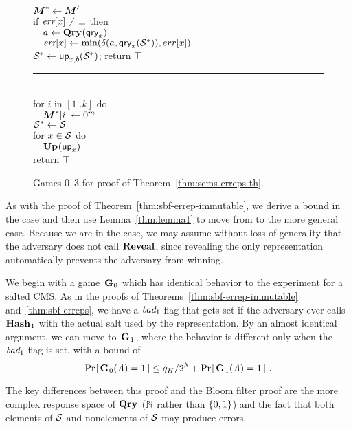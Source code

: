 \begin{figure*}
{    $\v.M^* \gets \v.M'$\\
    if $\textit{err}[x] \neq \bot$ then\\
      $\hspace*{10pt} a \gets \textup{\textbf{Qry}}\hspace{0.5pt}(\mathsf{qry}_x)$\\
      $\hspace*{10pt}\textit{err}[x] \gets \min(\delta(a,\mathsf{qry}_x(\mathcal{S}^*)),err[x])$\\
    $\mathcal{S}^* \gets \mathsf{up}_{x,b}(\mathcal{S}^*)$;
    return $\top$
  \vspace{6pt}\hrule\vspace{3pt}
  \oraclev{$\REPO(\col)$}\hfill{}\\[2pt]
    for $i$ in $[1..k]$ do\\
      $\tab \v.M^*[i] \gets 0^m$\\
    $\mathcal{S}^* \gets \mathcal{S}$\\
    for $x \in \mathcal{S}$ do\\
    $\hspace*{10pt}\textup{\textbf{Up}}\hspace{0.5pt}(\mathsf{up}_x)$\\
    return $\top$
}
\caption{Games 0--3 for proof of Theorem~\ref{thm:scms-erreps-th}.}
\label{fig:sbf-erreps/games}
\end{figure*}

As with the proof of Theorem~\ref{thm:sbf-errep-immutable}, we derive a bound in
the  case and then use Lemma~\ref{thm:lemma1} to move from  to
the more general \erreps case. Because we are in the  case, we may
assume without loss of generality that the adversary does not call $\mathbf{Reveal}$,
since revealing the only representation automatically prevents the adversary
from winning.

We begin with a game~$\textup{\textbf{G}}\hspace{0.5pt}_0$ which has identical behavior to the 
experiment for a salted CMS. As in the proofs of
Theorems~\ref{thm:sbf-errep-immutable} and~\ref{thm:sbf-erreps}, we have a
$\textit{bad}_1$ flag that gets set if the adversary ever calls $\textup{\textbf{Hash}}\hspace{0.5pt}_1$ with the
actual salt used by the representation. By an almost identical argument, we can
move to~$\textup{\textbf{G}}\hspace{0.5pt}_1$, where the behavior is different only when the $\textit{bad}_1$ flag
is set, with a bound of
\begin{equation}
  \Pr\hspace{-1pt}\left[\,\textup{\textbf{G}}\hspace{0.5pt}_0(\mathit{A})=1\,\right] \leq
    q_H/2^\lambda + \Pr\hspace{-1pt}\left[\,\textup{\textbf{G}}\hspace{0.5pt}_1(\mathit{A})=1\,\right] \,.
\end{equation}

The key differences between this proof and the Bloom filter proof are the more
complex response space of $\textup{\textbf{Qry}}\hspace{0.5pt}$ ($\mathbb{N}$ rather than $\{0,1\}$) and the fact that
both elements of $\mathcal{S}$ and nonelements of $\mathcal{S}$ may produce errors.

